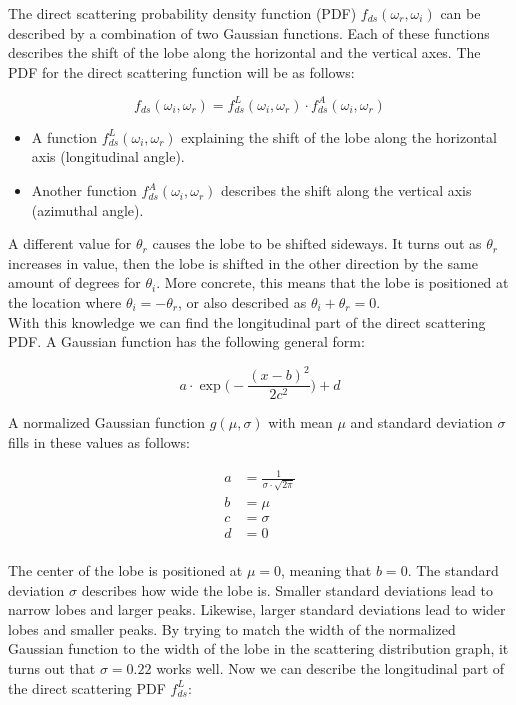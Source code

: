 \documentclass[11pt,a4paper]{report}
\begin{document}
The direct scattering probability density function (PDF) $f_{ds}(\omega_r, \omega_i)$ can be described by a combination of two Gaussian functions. Each of these functions describes the shift of the lobe along the horizontal and the vertical axes. The PDF for the direct scattering function will be as follows:

\begin{equation}
f_{ds}(\omega_i, \omega_r) = f_{ds}^L(\omega_i, \omega_r) \cdot f_{ds}^A(\omega_i, \omega_r)
\end{equation}

\begin{itemize}
\item A function $f_{ds}^L(\omega_i, \omega_r)$ explaining the shift of the lobe along the horizontal axis (longitudinal angle).

\item Another function $f_{ds}^A(\omega_i, \omega_r)$ describes the shift along the vertical axis (azimuthal angle).
\end{itemize}

A different value for $\theta_r$ causes the lobe to be shifted sideways. It turns out as $\theta_r$ increases in value, then the lobe is shifted in the other direction by the same amount of degrees for $\theta_i$. More concrete, this means that the lobe is positioned at the location where $\theta_i = -\theta_r$, or also described as $\theta_i + \theta_r = 0$. \\

With this knowledge we can find the longitudinal part of the direct scattering PDF. A Gaussian function has the following general form:

\begin{equation}
a \cdot \exp \Big ( -\frac{(x - b)^2}{2c^2} \Big ) + d 
\end{equation}

A normalized Gaussian function $g(\mu, \sigma)$ with mean $\mu$ and standard deviation $\sigma$ fills in these values as follows:

\begin{align}
a &= \frac{1}{\sigma \cdot \sqrt{2 \pi}} \\
b &= \mu \\
c &= \sigma \\
d &= 0 \\
\end{align}

The center of the lobe is positioned at $\mu = 0$, meaning that $b = 0$. The standard deviation $\sigma$ describes how wide the lobe is. Smaller standard deviations lead to narrow lobes and larger peaks. Likewise, larger standard deviations lead to wider lobes and smaller peaks. By trying to match the width of the normalized Gaussian function to the width of the lobe in the scattering distribution graph, it turns out that $\sigma = 0.22$ works well. Now we can describe the longitudinal part of the direct scattering PDF $f_{ds}^L$:
\end{document}
